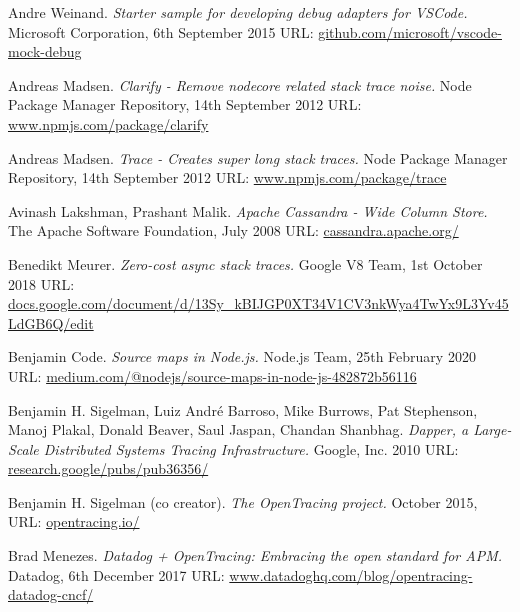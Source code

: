 \documentclass[12pt,pdftex,titlepage]{report}
\begin{document}
    \begin{small}
    \begin{thebibliography}{69}

        Andre Weinand. \textit{Starter sample for developing debug adapters for VSCode.}
        Microsoft Corporation, 6th September 2015
        {\scriptsize URL:} \url{github.com/microsoft/vscode-mock-debug}

        Andreas Madsen. \textit{Clarify - Remove nodecore related stack trace noise.}
        Node Package Manager Repository, 14th September 2012
        {\scriptsize URL:} \url{www.npmjs.com/package/clarify}
        
        Andreas Madsen. \textit{Trace - Creates super long stack traces.}
        Node Package Manager Repository, 14th September 2012
        {\scriptsize URL:} \url{www.npmjs.com/package/trace}

        Avinash Lakshman, Prashant Malik. \textit{Apache Cassandra - Wide Column Store.}
        The Apache Software Foundation, July 2008
        {\scriptsize URL:} \url{cassandra.apache.org/}

        Benedikt Meurer. \textit{Zero-cost async stack traces.}
        Google V8 Team, 1st October 2018
        {\scriptsize URL:} \url{docs.google.com/document/d/13Sy_kBIJGP0XT34V1CV3nkWya4TwYx9L3Yv45LdGB6Q/edit}

        Benjamin Code. \textit{Source maps in Node.js.}
        Node.js Team, 25th February 2020
        {\scriptsize URL:} \url{medium.com/@nodejs/source-maps-in-node-js-482872b56116}
        
        Benjamin H. Sigelman, Luiz André Barroso, Mike Burrows, Pat Stephenson, Manoj Plakal, Donald Beaver, Saul Jaspan, Chandan Shanbhag.
        \textit{Dapper, a Large-Scale Distributed Systems Tracing Infrastructure.}
        Google, Inc. 2010
        {\scriptsize URL:} \url{research.google/pubs/pub36356/}

        Benjamin H. Sigelman (co creator). \textit{The OpenTracing project.}
        October 2015, {\scriptsize URL:} \url{opentracing.io/}

        Brad Menezes. \textit{Datadog + OpenTracing: Embracing the open standard for APM.}
        Datadog, 6th December 2017
        {\scriptsize URL:} \url{www.datadoghq.com/blog/opentracing-datadog-cncf/}


\end{thebibliography}
\end{small}
\end{document}
